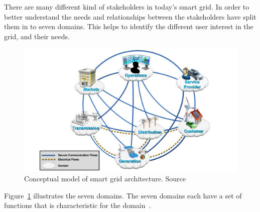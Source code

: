 There are many different kind of stakeholders in today's smart grid. In order to better understand the needs and relationships between the stakeholders have  split them in to seven domains. This helps to identify the different user interest in the grid, and their needs.  

\newpage %

\begin{figure}[H]
\centering
\includegraphics[width=1\textwidth]{billeder/SMARTGRID.png}
\caption[Conceptual model of smart grid architecture.]{Conceptual model of smart grid architecture. Source~\citep{RefWorks:41}}
\label{fig:CMOSG}
\end{figure}
 
Figure~\ref{fig:CMOSG} illustrates the seven domains. The seven domains each have a set of functions that is characteristic for the domain~\citep{RefWorks:41}.  
 
